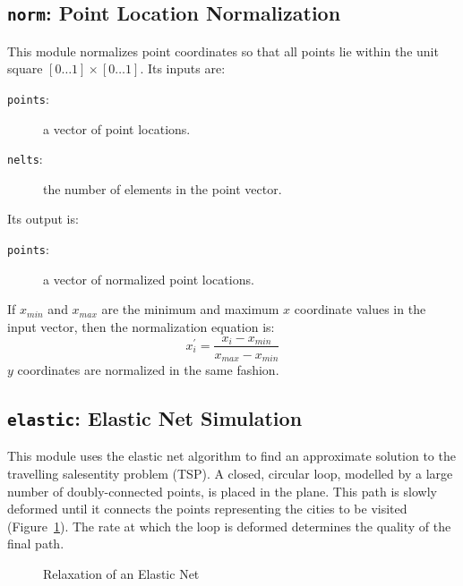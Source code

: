 \subsection{{\tt{norm}}:
	Point Location Normalization
	\label{s:toys-norm}}

This module normalizes point coordinates so that all points lie within the unit square $[0{\ldots}1]{\times}[0{\ldots}1]$.
Its inputs are:
\begin{description}
\item[{\tt{points}}:]
	a vector of point locations.
\item[{\tt{nelts}}:]
	the number of elements in the point vector.
\end{description}
Its output is:
\begin{description}
\item[{\tt{points}}:]
	a vector of normalized point locations.
\end{description}
If $x_{min}$ and $x_{max}$ are the minimum and maximum $x$ coordinate values in the input vector,
then the normalization equation is:
\[	x_{i}^{\prime} = \frac{x_i - x_{min}}{x_{max} - x_{min}}	\]
$y$ coordinates are normalized in the same fashion.

\subsection{{\tt{elastic}}:
	Elastic Net Simulation
	\label{s:toys-elastic}}

This module uses the elastic net algorithm \cite{b:elastic-net} to find an approximate solution to the travelling salesentity problem (TSP).
A closed, circular loop, modelled by a large number of doubly-connected points, is placed in the plane.
This path is slowly deformed until it connects the points representing the cities to be visited (Figure~\ref{f:elastic}).
The rate at which the loop is deformed determines the quality of the final path.

\begin{figure}
\begin{center}
\end{center}
\caption{Relaxation of an Elastic Net\label{f:elastic}}
\end{figure}

